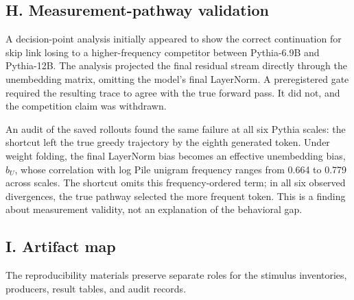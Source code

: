 \documentclass[
  english,
]{article}
\begin{document}
\subsection{H. Measurement-pathway validation}\label{h.-measurement-pathway-validation}

A decision-point analysis initially appeared to show the correct continuation for skip link losing to a higher-frequency competitor between Pythia-6.9B and Pythia-12B. The analysis projected the final residual stream directly through the unembedding matrix, omitting the model's final LayerNorm. A preregistered gate required the resulting trace to agree with the true forward pass. It did not, and the competition claim was withdrawn.

An audit of the saved rollouts found the same failure at all six Pythia scales: the shortcut left the true greedy trajectory by the eighth generated token. Under weight folding, the final LayerNorm bias becomes an effective unembedding bias, \(b_U\), whose correlation with log Pile unigram frequency ranges from 0.664 to 0.779 across scales. The shortcut omits this frequency-ordered term; in all six observed divergences, the true pathway selected the more frequent token. This is a finding about measurement validity, not an explanation of the behavioral gap.

\clearpage

\subsection{I. Artifact map}\label{i.-artifact-map}

The reproducibility materials preserve separate roles for the stimulus inventories, producers, result tables, and audit records.
\end{document}
